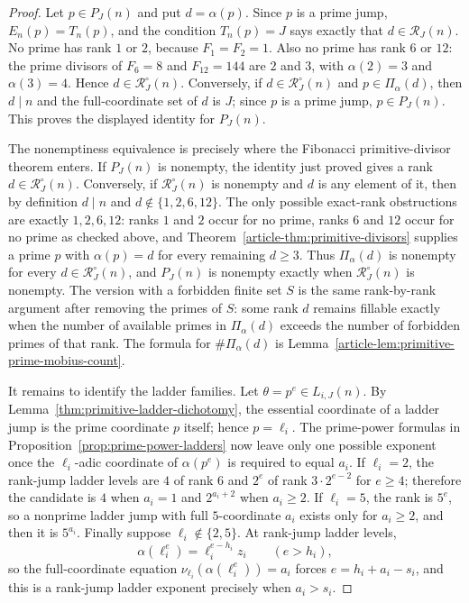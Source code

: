 \begin{proof}
Let $p\in P_J(n)$ and put $d=\alpha(p)$. Since $p$ is a prime jump,
$E_n(p)=T_n(p)$, and the condition $T_n(p)=J$ says exactly that
$d\in\mathcal R_J(n)$. No prime has rank $1$ or $2$, because
$F_1=F_2=1$. Also no prime has rank $6$ or $12$: the prime divisors of
$F_6=8$ and $F_{12}=144$ are $2$ and $3$, with
$\alpha(2)=3$ and $\alpha(3)=4$. Hence $d\in\mathcal R_J^\circ(n)$.
Conversely, if $d\in\mathcal R_J^\circ(n)$ and $p\in\Pi_\alpha(d)$, then
$d\mid n$ and the full-coordinate set of $d$ is $J$; since $p$ is a prime jump,
$p\in P_J(n)$. This proves the displayed identity for $P_J(n)$.

The nonemptiness equivalence is precisely where the Fibonacci primitive-divisor
theorem enters. If $P_J(n)$ is nonempty, the identity just proved gives a rank
$d\in\mathcal R_J^\circ(n)$. Conversely, if
$\mathcal R_J^\circ(n)$ is nonempty and $d$ is any element of it, then by
definition $d\mid n$ and $d\notin\{1,2,6,12\}$. The only possible
exact-rank obstructions are exactly $1,2,6,12$: ranks $1$ and $2$ occur for
no prime, ranks $6$ and $12$ occur for no prime as checked above, and
Theorem~\ref{article-thm:primitive-divisors} supplies a prime $p$ with
$\alpha(p)=d$ for every remaining $d\ge3$. Thus
$\Pi_\alpha(d)$ is nonempty for every $d\in\mathcal R_J^\circ(n)$, and
$P_J(n)$ is nonempty exactly when $\mathcal R_J^\circ(n)$ is nonempty. The
version with a forbidden finite set $S$ is the same rank-by-rank argument after
removing the primes of $S$: some rank $d$ remains fillable exactly when the
number of available primes in $\Pi_\alpha(d)$ exceeds the number of forbidden
primes of that rank. The formula for $\#\Pi_\alpha(d)$ is
Lemma~\ref{article-lem:primitive-prime-mobius-count}.

It remains to identify the ladder families. Let
$\theta=p^e\in L_{i,J}(n)$. By
Lemma~\ref{thm:primitive-ladder-dichotomy}, the essential coordinate of a
ladder jump is the prime coordinate $p$ itself; hence $p=\ell_i$. The
prime-power formulas in Proposition~\ref{prop:prime-power-ladders} now leave
only one possible exponent once the $\ell_i$-adic coordinate of
$\alpha(p^e)$ is required to equal $a_i$. If $\ell_i=2$, the rank-jump ladder
levels are $4$ of rank $6$ and $2^e$ of rank $3\cdot2^{e-2}$ for $e\ge4$;
therefore the candidate is $4$ when $a_i=1$ and $2^{a_i+2}$ when $a_i\ge2$.
If $\ell_i=5$, the rank is $5^e$, so a nonprime ladder jump with full
$5$-coordinate $a_i$ exists only for $a_i\ge2$, and then it is $5^{a_i}$.
Finally suppose $\ell_i\notin\{2,5\}$. At rank-jump ladder levels,
\[
\alpha(\ell_i^e)=\ell_i^{e-h_i}z_i\qquad(e>h_i),
\]
so the full-coordinate equation
$\nu_{\ell_i}(\alpha(\ell_i^e))=a_i$ forces
$e=h_i+a_i-s_i$, and this is a rank-jump ladder exponent precisely when
$a_i>s_i$.


\end{proof}

